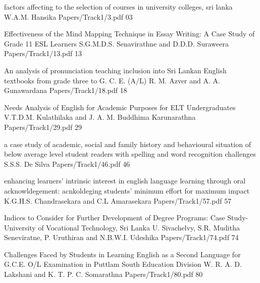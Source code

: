 
%   		 
%   		 



\addpaper
{factors affecting to the selection of courses in university colleges, sri lanka}
{W.A.M. Hansika}
{Papers/Track1/3.pdf}
{03}


\addpaper
	{Effectiveness of the Mind Mapping Technique in Essay Writing: A Case Study of Grade 11 ESL Learners}
	 {S.G.M.D.S. Senavirathne and D.D.D. Suraweera} 
	 {Papers/Track1/13.pdf}
    {13} 

  \addpaper
{An analysis of pronunciation teaching inclusion into Sri Lankan English textbooks from grade three to G. C. E. (A/L)}
 {R. M. Azver and A. A. Gunawardana} 
 {Papers/Track1/18.pdf}
   {18} 


   \addpaper
{Needs Analysis of English for Academic Purposes for ELT Undergraduates}
 {V.T.D.M. Kulathilaka and J. A. M. Buddhima Karunarathna} 
 {Papers/Track1/29.pdf}
   {29} 


\addpaper
{a case study of academic, social and family history and behavioural situation of below average level student readers with spelling and word recognition challenges}
{S.S.S. De Silva}
{Papers/Track1/46.pdf}
{46}




   \addpaper
{enhancing learners’ intrinsic interest in english language learning through oral acknowldegement: acnkoldeging students’ minimum effort for maximum impact}
 {K.G.H.S. Chandrasekara and C.L Amarasekara} 
 {Papers/Track1/57.pdf}
   {57} 


\addpaper
{Indices to Consider for Further Development of Degree Programs: Case Study-University of Vocational Technology, Sri Lanka}
{U. Sivachelvy, S.R. Muditha Seneviratne, P. Uruthiran and N.B.W.I. Udeshika}
{Papers/Track1/74.pdf}
{74}


\addpaper
{Challenges Faced by Students in Learning English as a Second Language for G.C.E. O/L Examination in Puttlam South Education Division}
{W. R. A. D. Lakshani and K. T. P. C. Somarathna}
{Papers/Track1/80.pdf}
{80}




